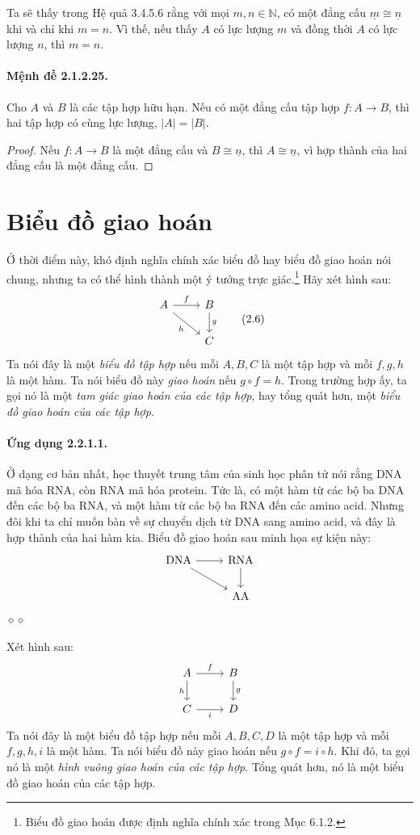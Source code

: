 Ta sẽ thấy trong Hệ quả 3.4.5.6 rằng với mọi $m,n\in\mathbb N$, có một đẳng cấu $\underline m\cong\underline n$ khi và chỉ khi $m=n$. Vì thế, nếu thấy $A$ có lực lượng $m$ và đồng thời $A$ có lực lượng $n$, thì $m=n$.
\paragraph{Mệnh đề 2.1.2.25.} Cho $A$ và $B$ là các tập hợp hữu hạn. Nếu có một đẳng cấu tập hợp $f:A\to B$, thì hai tập hợp có cùng lực lượng, $|A|=|B|$.
\begin{proof}Nếu $f:A\to B$ là một đẳng cấu và $B\cong\underline n$, thì $A\cong\underline n$, vì hợp thành của hai đẳng cấu là một đẳng cấu.\end{proof}
\section{Biểu đồ giao hoán}
Ở thời điểm này, khó định nghĩa chính xác biểu đồ hay biểu đồ giao hoán nói chung, nhưng ta có thể hình thành một ý tưởng trực giác.\footnote{Biểu đồ giao hoán được định nghĩa chính xác trong Mục 6.1.2.} Hãy xét hình sau:
\begin{equation*}\begin{tikzcd}A\arrow[r,"f"]\arrow[dr,"h"']&B\arrow[d,"g"]\\&C\end{tikzcd}\tag{2.6}\end{equation*}
Ta nói đây là một \emph{biểu đồ tập hợp} nếu mỗi $A,B,C$ là một tập hợp và mỗi $f,g,h$ là một hàm. Ta nói biểu đồ này \emph{giao hoán} nếu $g\circ f=h$. Trong trường hợp ấy, ta gọi nó là một \emph{tam giác giao hoán của các tập hợp}, hay tổng quát hơn, một \emph{biểu đồ giao hoán của các tập hợp}.
\paragraph{Ứng dụng 2.2.1.1.} Ở dạng cơ bản nhất, học thuyết trung tâm của sinh học phân tử nói rằng DNA mã hóa RNA, còn RNA mã hóa protein. Tức là, có một hàm từ các bộ ba DNA đến các bộ ba RNA, và một hàm từ các bộ ba RNA đến các amino acid. Nhưng đôi khi ta chỉ muốn bàn về sự chuyển dịch từ DNA sang amino acid, và đây là hợp thành của hai hàm kia. Biểu đồ giao hoán sau minh họa sự kiện này:
\[\begin{tikzcd}\mathrm{DNA}\arrow[r]\arrow[dr]&\mathrm{RNA}\arrow[d]\\&\mathrm{AA}\end{tikzcd}\]\hfill$\diamond\diamond$\par
Xét hình sau:
\[\begin{tikzcd}A\arrow[r,"f"]\arrow[d,"h"']&B\arrow[d,"g"]\\C\arrow[r,"i"']&D\end{tikzcd}\]
Ta nói đây là một biểu đồ tập hợp nếu mỗi $A,B,C,D$ là một tập hợp và mỗi $f,g,h,i$ là một hàm. Ta nói biểu đồ này giao hoán nếu $g\circ f=i\circ h$. Khi đó, ta gọi nó là một \emph{hình vuông giao hoán của các tập hợp}. Tổng quát hơn, nó là một biểu đồ giao hoán của các tập hợp.
